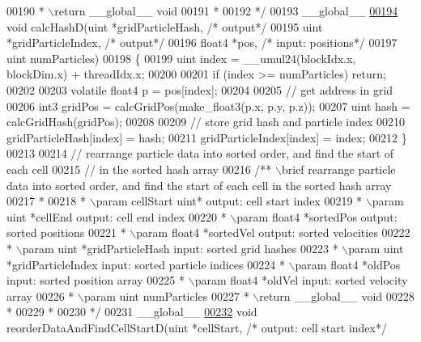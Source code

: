 \begin{DoxyCode}
00190 \textcolor{comment}{ * \(\backslash\)return \_\_global\_\_ void}
00191 \textcolor{comment}{ *}
00192 \textcolor{comment}{ */}
00193 \_\_global\_\_
\hypertarget{particles__kernel__impl_8cuh_source_l00194}{}\hyperlink{particles__kernel__impl_8cuh_a4c688195fb1c2963cbdcaf62c737b9d7}{00194} \textcolor{keywordtype}{void} calcHashD(uint   *gridParticleHash,  \textcolor{comment}{/* output*/}
00195                 uint   *gridParticleIndex, \textcolor{comment}{/* output*/}
00196                 float4 *pos,               \textcolor{comment}{/* input: positions*/}
00197                 uint    numParticles)
00198 \{
00199     uint index = \_\_umul24(blockIdx.x, blockDim.x) + threadIdx.x;
00200 
00201     \textcolor{keywordflow}{if} (index >= numParticles) \textcolor{keywordflow}{return};
00202 
00203     \textcolor{keyword}{volatile} float4 p = pos[index];
00204 
00205     \textcolor{comment}{// get address in grid}
00206     int3 gridPos = calcGridPos(make\_float3(p.x, p.y, p.z));
00207     uint hash = calcGridHash(gridPos);
00208 
00209     \textcolor{comment}{// store grid hash and particle index}
00210     gridParticleHash[index] = hash;
00211     gridParticleIndex[index] = index;
00212 \}
00213 
00214 \textcolor{comment}{// rearrange particle data into sorted order, and find the start of each cell}
00215 \textcolor{comment}{// in the sorted hash array}
00216 \textcolor{comment}{/** \(\backslash\)brief rearrange particle data into sorted order, and find the start of each cell in the sorted
       hash array}
00217 \textcolor{comment}{ *}
00218 \textcolor{comment}{ * \(\backslash\)param cellStart uint* output: cell start index}
00219 \textcolor{comment}{ * \(\backslash\)param uint   *cellEnd output: cell end index}
00220 \textcolor{comment}{ * \(\backslash\)param float4 *sortedPos output: sorted positions}
00221 \textcolor{comment}{ * \(\backslash\)param float4 *sortedVel output: sorted velocities}
00222 \textcolor{comment}{ * \(\backslash\)param uint   *gridParticleHash input: sorted grid hashes}
00223 \textcolor{comment}{ * \(\backslash\)param uint   *gridParticleIndex input: sorted particle indices}
00224 \textcolor{comment}{ * \(\backslash\)param float4 *oldPos input: sorted position array}
00225 \textcolor{comment}{ * \(\backslash\)param float4 *oldVel input: sorted velocity array}
00226 \textcolor{comment}{ * \(\backslash\)param uint    numParticles}
00227 \textcolor{comment}{ * \(\backslash\)return \_\_global\_\_ void}
00228 \textcolor{comment}{ *}
00229 \textcolor{comment}{ *}
00230 \textcolor{comment}{ */}
00231 \_\_global\_\_
\hypertarget{particles__kernel__impl_8cuh_source_l00232}{}\hyperlink{particles__kernel__impl_8cuh_abe84636059af3ed58ef603665395e6f4}{00232} \textcolor{keywordtype}{void} reorderDataAndFindCellStartD(uint   *cellStart,        \textcolor{comment}{/* output: cell start index*/}

\end{DoxyCode}

